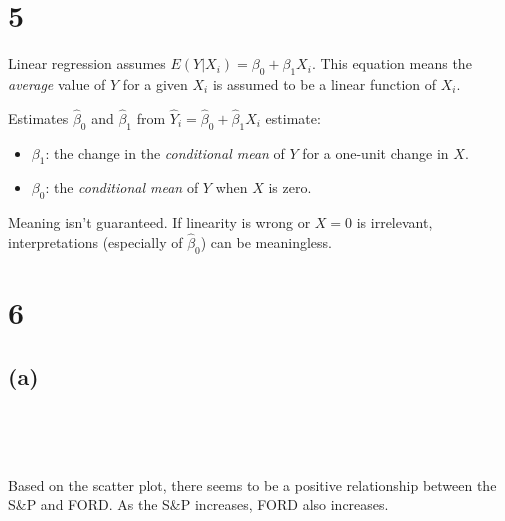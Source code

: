     \section{5}\label{section}

    Linear regression assumes \(E(Y | X_i) = \beta_0 + \beta_1X_i\). This
equation means the \emph{average} value of \(Y\) for a given \(X_i\) is
assumed to be a linear function of \(X_i\).

Estimates \(\hat{\beta}_0\) and \(\hat{\beta}_1\) from
\(\hat{Y}_i = \hat{\beta}_0 + \hat{\beta}_1X_i\) estimate:

\begin{itemize}
\tightlist
\item
  \(\beta_1\): the change in the \emph{conditional mean} of \(Y\) for a
  one-unit change in \(X\).
\item
  \(\beta_0\): the \emph{conditional mean} of \(Y\) when \(X\) is zero.
\end{itemize}

Meaning isn't guaranteed. If linearity is wrong or \(X=0\) is
irrelevant, interpretations (especially of \(\hat{\beta}_0\)) can be
meaningless.

    \section{6}\label{section}

    \subsection{(a)}\label{a}

    \begin{center}
    \end{center}
    { \hspace*{\fill} \\}
    
    \begin{center}
    \end{center}
    { \hspace*{\fill} \\}
    
    Based on the scatter plot, there seems to be a positive relationship
between the S\&P and FORD. As the S\&P increases, FORD also increases.

